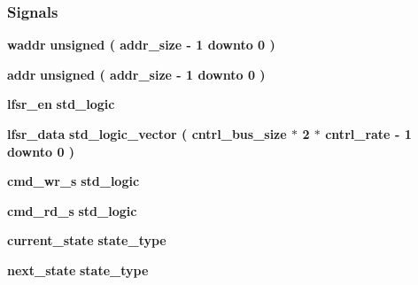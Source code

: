 \subsubsection*{Signals}
 \begin{DoxyCompactItemize}
\item 
{\bf waddr} {\bfseries \textcolor{comment}{unsigned}\textcolor{vhdlchar}{ }\textcolor{vhdlchar}{(}\textcolor{vhdlchar}{ }\textcolor{vhdlchar}{ }\textcolor{vhdlchar}{ }\textcolor{vhdlchar}{ }{\bfseries {\bf addr\+\_\+size}} \textcolor{vhdlchar}{-\/}\textcolor{vhdlchar}{ } \textcolor{vhdldigit}{1} \textcolor{vhdlchar}{ }\textcolor{keywordflow}{downto}\textcolor{vhdlchar}{ }\textcolor{vhdlchar}{ } \textcolor{vhdldigit}{0} \textcolor{vhdlchar}{ }\textcolor{vhdlchar}{)}\textcolor{vhdlchar}{ }} 
\item 
{\bf addr} {\bfseries \textcolor{comment}{unsigned}\textcolor{vhdlchar}{ }\textcolor{vhdlchar}{(}\textcolor{vhdlchar}{ }\textcolor{vhdlchar}{ }\textcolor{vhdlchar}{ }\textcolor{vhdlchar}{ }{\bfseries {\bf addr\+\_\+size}} \textcolor{vhdlchar}{-\/}\textcolor{vhdlchar}{ } \textcolor{vhdldigit}{1} \textcolor{vhdlchar}{ }\textcolor{keywordflow}{downto}\textcolor{vhdlchar}{ }\textcolor{vhdlchar}{ } \textcolor{vhdldigit}{0} \textcolor{vhdlchar}{ }\textcolor{vhdlchar}{)}\textcolor{vhdlchar}{ }} 
\item 
{\bf lfsr\+\_\+en} {\bfseries \textcolor{comment}{std\+\_\+logic}\textcolor{vhdlchar}{ }} 
\item 
{\bf lfsr\+\_\+data} {\bfseries \textcolor{comment}{std\+\_\+logic\+\_\+vector}\textcolor{vhdlchar}{ }\textcolor{vhdlchar}{(}\textcolor{vhdlchar}{ }\textcolor{vhdlchar}{ }\textcolor{vhdlchar}{ }\textcolor{vhdlchar}{ }{\bfseries {\bf cntrl\+\_\+bus\+\_\+size}} \textcolor{vhdlchar}{$\ast$}\textcolor{vhdlchar}{ } \textcolor{vhdldigit}{2} \textcolor{vhdlchar}{$\ast$}\textcolor{vhdlchar}{ }\textcolor{vhdlchar}{ }\textcolor{vhdlchar}{ }{\bfseries {\bf cntrl\+\_\+rate}} \textcolor{vhdlchar}{-\/}\textcolor{vhdlchar}{ } \textcolor{vhdldigit}{1} \textcolor{vhdlchar}{ }\textcolor{keywordflow}{downto}\textcolor{vhdlchar}{ }\textcolor{vhdlchar}{ } \textcolor{vhdldigit}{0} \textcolor{vhdlchar}{ }\textcolor{vhdlchar}{)}\textcolor{vhdlchar}{ }} 
\item 
{\bf cmd\+\_\+wr\+\_\+s} {\bfseries \textcolor{comment}{std\+\_\+logic}\textcolor{vhdlchar}{ }} 
\item 
{\bf cmd\+\_\+rd\+\_\+s} {\bfseries \textcolor{comment}{std\+\_\+logic}\textcolor{vhdlchar}{ }} 
\item 
{\bf current\+\_\+state} {\bfseries {\bfseries {\bf state\+\_\+type}} \textcolor{vhdlchar}{ }} 
\item 
{\bf next\+\_\+state} {\bfseries {\bfseries {\bf state\+\_\+type}} \textcolor{vhdlchar}{ }} 
\end{DoxyCompactItemize}
